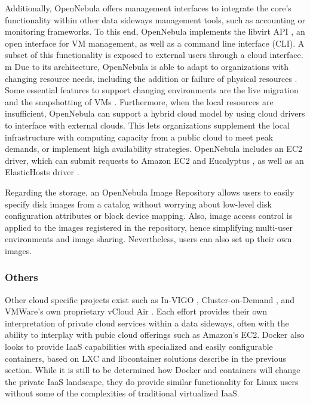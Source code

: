 Additionally, OpenNebula offers management interfaces to integrate the core's functionality within other data sideways management tools, such as accounting or monitoring frameworks. To this end, OpenNebula implements the libvirt API \cite{www/libvirt}, an open interface for VM management, as well as a command line interface (CLI). A subset of this functionality is exposed to external users through a cloud interface.
m
Due to its architecture, OpenNebula is able to adapt to organizations with changing re­source needs, including the addition or failure of physical resources \cite{sotomayorvirtual}. Some essential features to support changing environments are the live migration and the snapshotting of VMs \cite{www/opennebula}. Furthermore, when the local resources are insufficient, OpenNebula can support a hybrid cloud model by using cloud drivers to inter­face with external clouds. This lets organizations supplement the local infrastructure with computing capacity from a public cloud to meet peak demands, or implement high availability strategies. OpenNebula includes an EC2 driver, which can submit requests to Amazon EC2 \cite{www/amazonec2} and Eucalyptus \cite{nurmi2008eos}, as well as an ElasticHosts driver \cite{www/elastichosts}.

Regarding the storage, an OpenNebula Image Repository allows users to easily specify disk images from a catalog without worrying about low-level disk configuration attributes or block device mapping. Also, image access control is applied to the images registered in the repository, hence simplifying multi-user environments and image sharing. Nevertheless, users can also set up their own images. 


\subsubsection{Others}

Other cloud specific projects exist such as In-VIGO \cite{DBLP:journals/fgcs/AdabalaCCFFKMTZZZZ05}, Cluster-on-Demand \cite{chase2003dvc}, and VMWare's own proprietary vCloud Air \cite{www-vmware-vcloud}.  Each effort provides their own interpretation of private cloud services within a data sideways, often with the ability to interplay with pubic cloud offerings such as Amazon's EC2. Docker \cite{merkel2014docker} also looks to provide IaaS capabilities with specialized and easily configurable containers, based on LXC and libcontainer solutions describe in the previous section. While it is still to be determined how Docker and containers will change the private IaaS landscape, they do provide similar functionality for Linux users without some of the complexities of traditional virtualized IaaS.  



